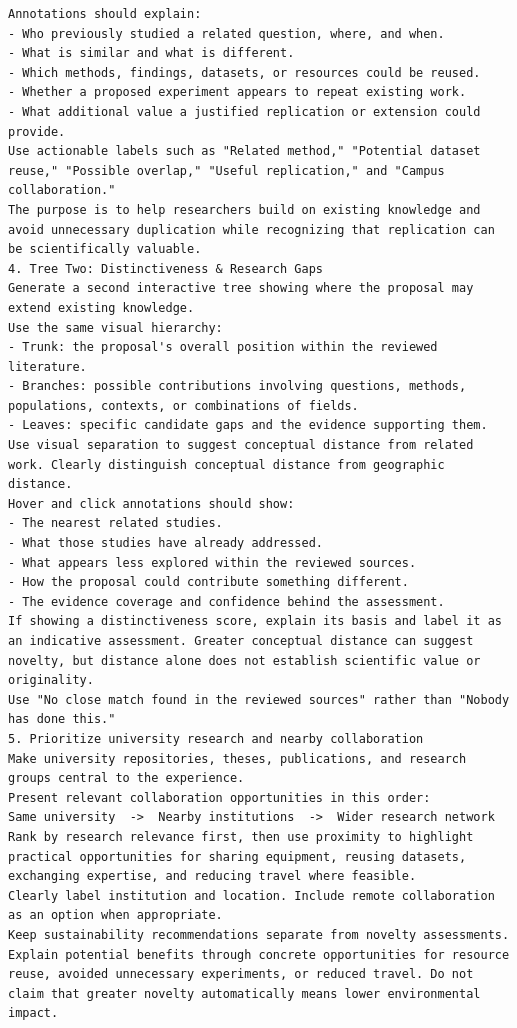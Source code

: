 \documentclass[11pt,a4paper]{article}
\begin{document}
\begin{itemize}[leftmargin=*]
\begin{lstlisting}
Annotations should explain:
- Who previously studied a related question, where, and when.
- What is similar and what is different.
- Which methods, findings, datasets, or resources could be reused.
- Whether a proposed experiment appears to repeat existing work.
- What additional value a justified replication or extension could provide.
Use actionable labels such as "Related method," "Potential dataset reuse," "Possible overlap," "Useful replication," and "Campus collaboration."
The purpose is to help researchers build on existing knowledge and avoid unnecessary duplication while recognizing that replication can be scientifically valuable.
4. Tree Two: Distinctiveness & Research Gaps
Generate a second interactive tree showing where the proposal may extend existing knowledge.
Use the same visual hierarchy:
- Trunk: the proposal's overall position within the reviewed literature.
- Branches: possible contributions involving questions, methods, populations, contexts, or combinations of fields.
- Leaves: specific candidate gaps and the evidence supporting them.
Use visual separation to suggest conceptual distance from related work. Clearly distinguish conceptual distance from geographic distance.
Hover and click annotations should show:
- The nearest related studies.
- What those studies have already addressed.
- What appears less explored within the reviewed sources.
- How the proposal could contribute something different.
- The evidence coverage and confidence behind the assessment.
If showing a distinctiveness score, explain its basis and label it as an indicative assessment. Greater conceptual distance can suggest novelty, but distance alone does not establish scientific value or originality.
Use "No close match found in the reviewed sources" rather than "Nobody has done this."
5. Prioritize university research and nearby collaboration
Make university repositories, theses, publications, and research groups central to the experience.
Present relevant collaboration opportunities in this order:
Same university  ->  Nearby institutions  ->  Wider research network
Rank by research relevance first, then use proximity to highlight practical opportunities for sharing equipment, reusing datasets, exchanging expertise, and reducing travel where feasible.
Clearly label institution and location. Include remote collaboration as an option when appropriate.
Keep sustainability recommendations separate from novelty assessments. Explain potential benefits through concrete opportunities for resource reuse, avoided unnecessary experiments, or reduced travel. Do not claim that greater novelty automatically means lower environmental impact.

\end{lstlisting}
\end{itemize}
\end{document}
